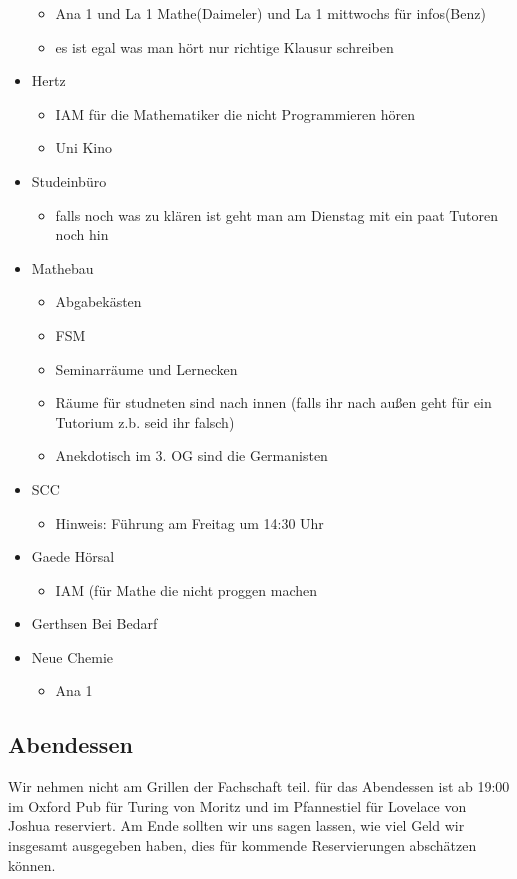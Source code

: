 \documentclass[10pt,twocolumn,ngerman]{scrartcl}
\begin{document}
\begin{itemize}
\begin{itemize}
\item Ana 1 und La 1 Mathe(Daimeler) und La 1 mittwochs für infos(Benz)
\item es ist egal was man hört nur richtige Klausur schreiben 
\end{itemize}
\item Hertz
\begin{itemize}
\item IAM für die Mathematiker die nicht Programmieren hören
\item Uni Kino
\end{itemize}
\item Studeinbüro
\begin{itemize}
\item falls noch was zu klären ist geht man am Dienstag mit ein paat Tutoren
noch hin
\end{itemize}
\item Mathebau
\begin{itemize}
\item Abgabekästen
\item FSM 
\item Seminarräume und Lernecken 
\item Räume für studneten sind nach innen (falls ihr nach außen geht für
ein Tutorium z.b. seid ihr falsch)
\item Anekdotisch im 3. OG sind die Germanisten
\end{itemize}
\item SCC
\begin{itemize}
\item Hinweis: Führung am Freitag um 14:30 Uhr
\end{itemize}
\item Gaede Hörsal
\begin{itemize}
\item IAM (für Mathe die nicht proggen machen
\end{itemize}
\item Gerthsen Bei Bedarf
\item Neue Chemie
\begin{itemize}
\item Ana 1
\end{itemize}
\end{itemize}

\subsection{Abendessen}

Wir nehmen nicht am Grillen der Fachschaft teil. für das Abendessen
ist ab 19:00 im Oxford Pub für Turing von Moritz und im Pfannestiel
für Lovelace von Joshua reserviert. Am Ende sollten wir uns sagen
lassen, wie viel Geld wir insgesamt ausgegeben haben, dies für kommende
Reservierungen abschätzen können.
\end{document}

